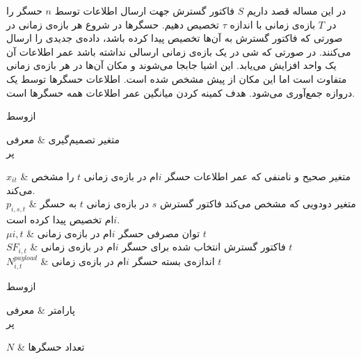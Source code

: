 

در این مساله قصد داریم $S$ فاکتور گسترش جهت ارسال اطلاعات توسط $n$ حسگر را در $T$ بازه‌ی زمانی با اندازه $\tau$ تخصیص دهیم.
حسگرها در شروع هر بازه‌ی زمانی در صورتی که فاکتور گسترش به آن‌ها تخصیص پیدا کرده باشد، داده‌ی جدیدی را ارسال می‌کنند.
در صورتی که شی در یک بازه‌ی زمانی ارسالی نداشته باشد عمر اطلاعات آن یک واحد افزایش می‌یابد.
این اشیا جابجا می‌شوند و مکان آن‌ها در هر بازه‌ی زمانی متفاوت است اما این مکان از پیش مشخص شده است.
اطلاعات حسگر‌ها توسط یک دروازه جمع‌آوری می‌شود.
هدف کمینه کردن میانگین عمر اطلاعات همه حسگر‌ها است.


‌ازوسط



متغیر تصمیم‌گیری & معرفی \\

‌پر

$x_{it}$ & متغیر صحیح و نامنفی که عمر اطلاعات حسگر $i$ام در بازه‌ی زمانی $t$ را مشخص می‌کند. \\

$p_{i,s,t}$ & متغیر دودویی که مشخص می‌کند فاکتور گسترش $s$ در بازه‌ی زمانی $t$ به حسگر $i$ام تخصیص پیدا کرده است. \\

$\mu{i,t}$ & توان مصرفی حسگر $i$ام در بازه‌ی زمانی $t$ \\

$SF_{i,t}$ & فاکتور گسترش انتخاب شده برای حسگر $i$ام در بازه‌ی زمانی $t$ \\

$N^{payload}_{i,t}$ & اندازه‌ی بسته حسگر $i$ام در بازه‌ی زمانی $t$ \\





‌ازوسط



پارامتر & معرفی \\

‌پر

$N$ & تعداد حسگرها \\

